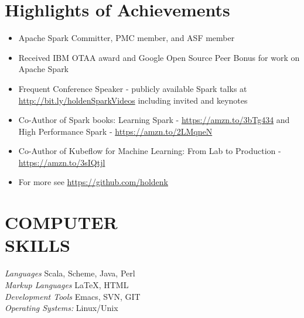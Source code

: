 \documentclass[10pt,line,margin=0.1]{newsres}
\begin{document}
\address{San Francisco, CA, USA}
\address{E-mail: holden@pigscanfly.ca, Cell: (425) 233-8271}
 
\begin{resume}
  \section{Highlights of Achievements}
  \begin{itemize}  \itemsep -2pt %
  \item{Apache Spark Committer, PMC member, and ASF member}
  \item{Received IBM OTAA award and Google Open Source Peer Bonus for work on Apache Spark}
  \item{Frequent Conference Speaker - publicly available Spark talks at \url{http://bit.ly/holdenSparkVideos} including invited and keynotes}
  \item{Co-Author of Spark books: Learning Spark - \url{https://amzn.to/3bTg434} and High Performance Spark - \url{https://amzn.to/2LMqneN}}
  \item{Co-Author of Kubeflow for Machine Learning: From Lab to Production  - \url{https://amzn.to/3sIQtjl}}
  \item{For more see \url{https://github.com/holdenk}}
\end{itemize}
\section{COMPUTER \\ SKILLS} {\sl Languages} Scala, Scheme, Java, Perl \\
                {\sl Markup Languages} \LaTeX , HTML \\
                {\sl Development Tools} Emacs, SVN, GIT \\
                {\sl Operating Systems:}  Linux/Unix \\
 

\end{resume}
\end{document}
